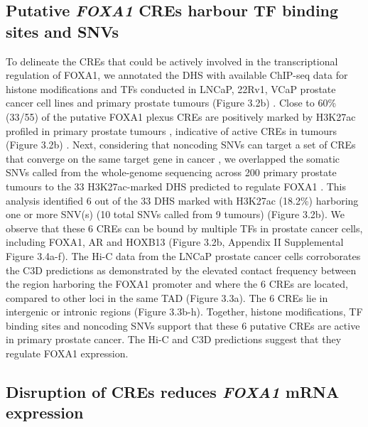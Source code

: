 \subsection{Putative \emph{FOXA1} CREs harbour TF binding sites and SNVs}

To delineate the CREs that could be actively involved in the transcriptional regulation of FOXA1, we annotated the DHS with available ChIP-seq data for histone modifications and TFs conducted in LNCaP, 22Rv1, VCaP prostate cancer cell lines and primary prostate tumours (Figure 3.2b) \cite{pomerantzAndrogenReceptorCistrome2015,kronTMPRSS2ERGFusion2017}.
Close to 60\% (33/55) of the putative FOXA1 plexus CREs are positively marked by H3K27ac profiled in primary prostate tumours \cite{kronTMPRSS2ERGFusion2017}, indicative of active CREs in tumours (Figure 3.2b) \cite{creyghtonHistoneH3K27acSeparates2010}.
Next, considering that noncoding SNVs can target a set of CREs that converge on the same target gene in cancer \cite{baileyNoncodingSomaticInherited2016}, we overlapped the somatic SNVs called from the whole-genome sequencing across 200 primary prostate tumours to the 33 H3K27ac-marked DHS predicted to regulate FOXA1 \cite{fraserGenomicHallmarksLocalized2017,espirituEvolutionaryLandscapeLocalized2018}.
This analysis identified 6 out of the 33 DHS marked with H3K27ac (18.2\%) harboring one or more SNV(s) (10 total SNVs called from 9 tumours) (Figure 3.2b).
We observe that these 6 CREs can be bound by multiple TFs in prostate cancer cells, including FOXA1, AR and HOXB13 (Figure 3.2b, Appendix II Supplemental Figure 3.4a-f).
The Hi-C data from the LNCaP prostate cancer cells corroborates the C3D predictions as demonstrated by the elevated contact frequency between the region harboring the FOXA1 promoter and where the 6 CREs are located, compared to other loci in the same TAD (Figure 3.3a).
The 6 CREs lie in intergenic or intronic regions (Figure 3.3b-h).
Together, histone modifications, TF binding sites and noncoding SNVs support that these 6 putative CREs are active in primary prostate cancer.
The Hi-C and C3D predictions suggest that they regulate FOXA1 expression.

\subsection{Disruption of CREs reduces \emph{FOXA1} mRNA expression}

